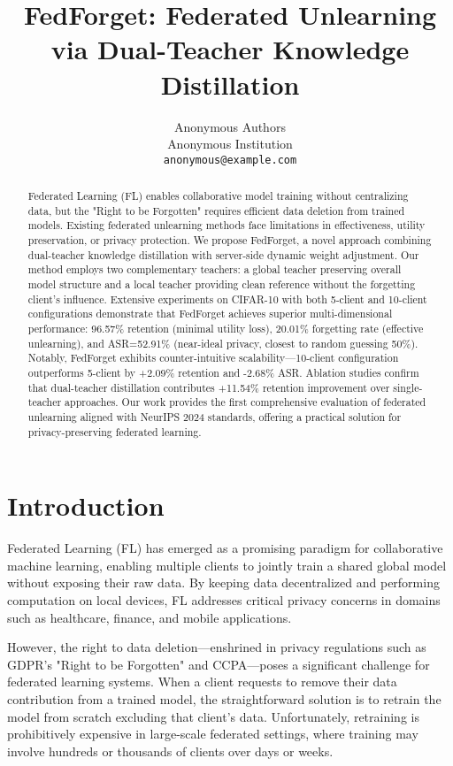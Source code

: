 \documentclass[10pt,twocolumn]{article}
\title{FedForget: Federated Unlearning via Dual-Teacher Knowledge Distillation}
\author{
Anonymous Authors\\
Anonymous Institution\\
\texttt{anonymous@example.com}
}
\date{}
\begin{document}
\maketitle

\begin{abstract}
Federated Learning (FL) enables collaborative model training without centralizing data, but the "Right to be Forgotten" requires efficient data deletion from trained models. Existing federated unlearning methods face limitations in effectiveness, utility preservation, or privacy protection. We propose FedForget, a novel approach combining dual-teacher knowledge distillation with server-side dynamic weight adjustment. Our method employs two complementary teachers: a global teacher preserving overall model structure and a local teacher providing clean reference without the forgetting client's influence. Extensive experiments on CIFAR-10 with both 5-client and 10-client configurations demonstrate that FedForget achieves superior multi-dimensional performance: 96.57\% retention (minimal utility loss), 20.01\% forgetting rate (effective unlearning), and ASR=52.91\% (near-ideal privacy, closest to random guessing 50\%). Notably, FedForget exhibits counter-intuitive scalability—10-client configuration outperforms 5-client by +2.09\% retention and -2.68\% ASR. Ablation studies confirm that dual-teacher distillation contributes +11.54\% retention improvement over single-teacher approaches. Our work provides the first comprehensive evaluation of federated unlearning aligned with NeurIPS 2024 standards, offering a practical solution for privacy-preserving federated learning.
\end{abstract}

\section{Introduction}

Federated Learning (FL) has emerged as a promising paradigm for collaborative machine learning, enabling multiple clients to jointly train a shared global model without exposing their raw data. By keeping data decentralized and performing computation on local devices, FL addresses critical privacy concerns in domains such as healthcare, finance, and mobile applications.

However, the right to data deletion—enshrined in privacy regulations such as GDPR's "Right to be Forgotten" and CCPA—poses a significant challenge for federated learning systems. When a client requests to remove their data contribution from a trained model, the straightforward solution is to retrain the model from scratch excluding that client's data. Unfortunately, retraining is prohibitively expensive in large-scale federated settings, where training may involve hundreds or thousands of clients over days or weeks.
\end{document}
